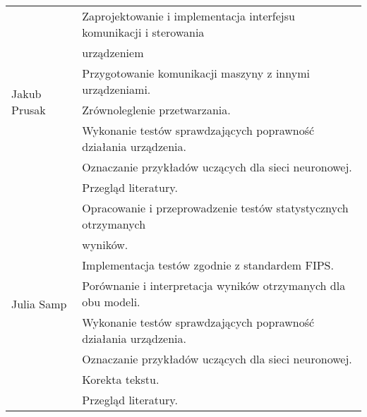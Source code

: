 \begin{table} [h]
\begin{tabular}{|l|l|}
        \multirow{7}{*}{Jakub Prusak} 
            & Zaprojektowanie i implementacja interfejsu komunikacji i sterowania \\
            & urządzeniem\\
            & Przygotowanie komunikacji maszyny z innymi urządzeniami. \\
            & Zrównoleglenie przetwarzania. \\
            & Wykonanie testów sprawdzających poprawność działania urządzenia. \\
            & Oznaczanie przykładów uczących dla sieci neuronowej. \\
            & Przegląd literatury. \\
        \hline
        \multirow{8}{*}{Julia Samp} 
            & Opracowanie i przeprowadzenie testów statystycznych otrzymanych \\
            & wyników. \\
            & Implementacja testów zgodnie z standardem FIPS. \\
            & Porównanie i interpretacja wyników otrzymanych dla obu modeli. \\
            & Wykonanie testów sprawdzających poprawność działania urządzenia. \\
            & Oznaczanie przykładów uczących dla sieci neuronowej. \\
            & Korekta tekstu. \\
            & Przegląd literatury. \\
        \hline  
    \end{tabular} 
\end{table}   
